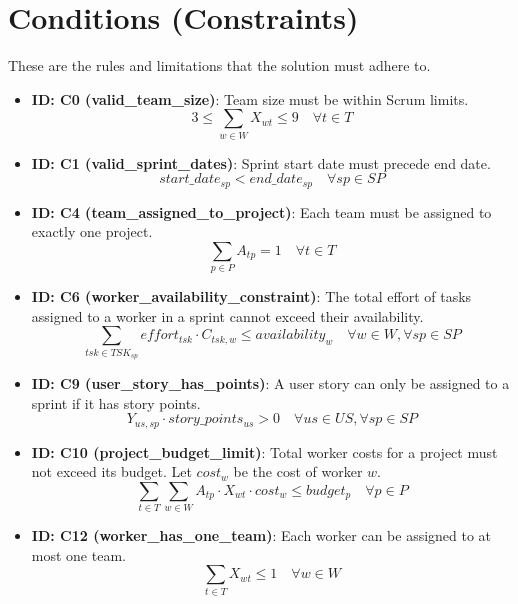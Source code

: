 \documentclass{article}
\begin{document}
\section{Conditions (Constraints)}
These are the rules and limitations that the solution must adhere to.

\begin{itemize}
    \item \textbf{ID: C0 (valid\_team\_size)}: Team size must be within Scrum limits.
    $$ 3 \le \sum_{w \in W} X_{wt} \le 9 \quad \forall t \in T $$
    \item \textbf{ID: C1 (valid\_sprint\_dates)}: Sprint start date must precede end date.
    $$ start\_date_{sp} < end\_date_{sp} \quad \forall sp \in SP $$
    \item \textbf{ID: C4 (team\_assigned\_to\_project)}: Each team must be assigned to exactly one project.
    $$ \sum_{p \in P} A_{tp} = 1 \quad \forall t \in T $$
    \item \textbf{ID: C6 (worker\_availability\_constraint)}: The total effort of tasks assigned to a worker in a sprint cannot exceed their availability.
    $$ \sum_{tsk \in TSK_{sp}} effort_{tsk} \cdot C_{tsk,w} \le availability_w \quad \forall w \in W, \forall sp \in SP $$
    \item \textbf{ID: C9 (user\_story\_has\_points)}: A user story can only be assigned to a sprint if it has story points.
    $$ Y_{us,sp} \cdot story\_points_{us} > 0 \quad \forall us \in US, \forall sp \in SP $$
    \item \textbf{ID: C10 (project\_budget\_limit)}: Total worker costs for a project must not exceed its budget. Let $cost_w$ be the cost of worker $w$.
    $$ \sum_{t \in T} \sum_{w \in W} A_{tp} \cdot X_{wt} \cdot cost_w \le budget_p \quad \forall p \in P $$
    \item \textbf{ID: C12 (worker\_has\_one\_team)}: Each worker can be assigned to at most one team.
    $$ \sum_{t \in T} X_{wt} \le 1 \quad \forall w \in W $$
\end{itemize}
\end{document}
